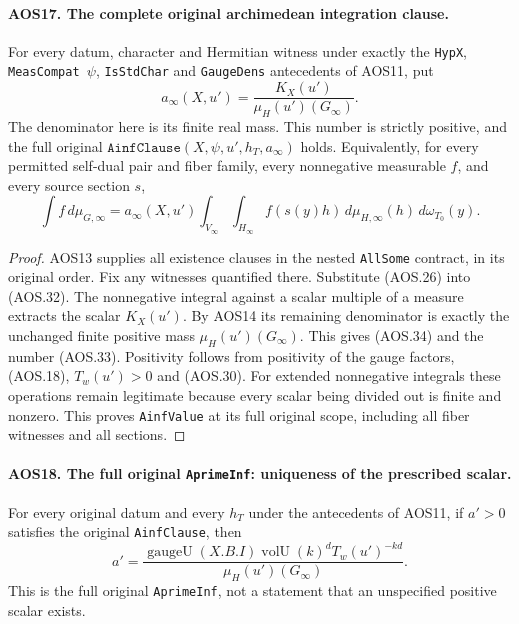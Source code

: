 \paragraph{AOS17. The complete original archimedean integration clause.}
\label{claim:AOS17}
For every datum, character and Hermitian witness under exactly the
\texttt{HypX}, \texttt{MeasCompat\,$\psi$}, \texttt{IsStdChar}
and \texttt{GaugeDens} antecedents of AOS11, put
\[
             a_\infty(X,u')
                 =\frac{K_X(u')}{\mu_H(u')(G_\infty)}.
 \tag{AOS.33}
\]
The denominator here is its finite real mass.  This number is
strictly positive, and the full original
$\texttt{AinfClause}(X,\psi,u',h_T,a_\infty)$ holds.  Equivalently,
for every permitted self-dual pair and fiber family, every
nonnegative measurable $f$, and every source section $s$,
\[
       \int f\,d\mu_{G,\infty}
          =a_\infty(X,u')
             \int_{V_\infty}\int_{H_\infty}
                    f(s(y)h)\,d\mu_{H,\infty}(h)\,d\omega_{T_0}(y).
 \tag{AOS.34}
\]

\begin{proof}
AOS13 supplies all existence clauses in the nested \texttt{AllSome}
contract, in its original order.  Fix any witnesses quantified
there.  Substitute (AOS.26) into (AOS.32).  The nonnegative
integral against a scalar multiple of a measure extracts the
scalar $K_X(u')$.  By AOS14 its remaining denominator is exactly
the unchanged finite positive mass $\mu_H(u')(G_\infty)$.
This gives (AOS.34) and the number (AOS.33).  Positivity follows
from positivity of the gauge factors, (AOS.18), $T_w(u')>0$ and
(AOS.30).  For extended nonnegative integrals these operations
remain legitimate because every scalar being divided out is finite
and nonzero.  This proves \texttt{AinfValue} at its full original
scope, including all fiber witnesses and all sections.
\end{proof}

\paragraph{AOS18. The full original \texttt{AprimeInf}: uniqueness of the prescribed scalar.}
\label{claim:AOS18}
For every original datum and every $h_T$ under the antecedents of
AOS11, if $a'>0$ satisfies the original \texttt{AinfClause}, then
\[
       a'=\frac{\operatorname{gaugeU}(X.B.I)
                         \operatorname{volU}(k)^dT_w(u')^{-kd}}
                        {\mu_H(u')(G_\infty)}.
 \tag{AOS.35}
\]
This is the full original \texttt{AprimeInf}, not a statement that
an unspecified positive scalar exists.

